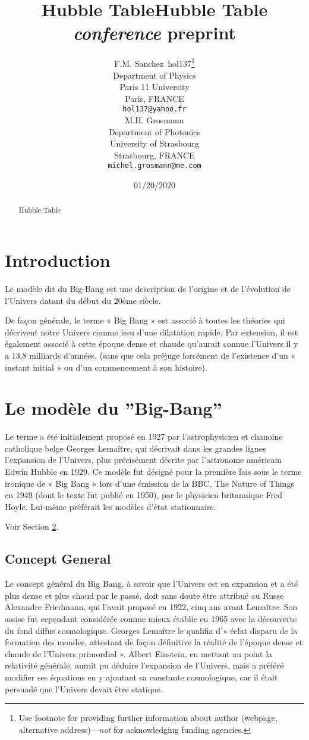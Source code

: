 \documentclass[a4paper,9pt]{article}
\title{Hubble Table}
\date{01/20/2020}
\title{Hubble Table \emph{conference} preprint}
\author{
  F.M. Sanchez~hol137\thanks{Use footnote for providing further
    information about author (webpage, alternative
    address)---\emph{not} for acknowledging funding agencies.} \\
  Department of Physics\\
  Paris 11 University\\
  Paris, FRANCE \\
  \texttt{hol137@yahoo.fr} \\
   \And
 M.H. Grosmann \\
  Department of Photonics\\
  University of Strasbourg\\
  Strasbourg, FRANCE \\
  \texttt{michel.grosmann@me.com} \\
}
\begin{document}
\maketitle

\begin{abstract}
Hubble Table
\end{abstract}




\section{Introduction}

Le modèle dit du Big-Bang est une description de l'origine et de l'évolution de l’Univers datant du début du 20éme siècle.

De façon générale, le terme « Big Bang » est associé à toutes les théories qui décrivent notre Univers comme issu d'une dilatation rapide. Par extension, il est également associé à cette époque dense et chaude qu’aurait connue l’Univers il y a 13,8 milliards d’années, (sans que cela préjuge forcément de l’existence d’un « instant initial » ou d’un commencement à son histoire).

\section{Le modèle du ”Big-Bang”}
\label{sec:headings}

Le terme a été initialement proposé en 1927 par l'astrophysicien  et chanoine catholique belge Georges Lemaître, qui décrivait dans les grandes lignes l’expansion de l'Univers, plus précisément décrite par l'astronome américain Edwin Hubble en 1929. Ce modèle fut désigné pour la première fois sous le terme ironique de « Big Bang » lors d’une émission de la BBC, The Nature of Things en 1949 (dont le texte fut publié en 1950), par le physicien britannique Fred Hoyle. Lui-même préférait les modèles d'état stationnaire.

Voir Section \ref{sec:headings}.

\subsection{Concept General}
Le concept général du Big Bang, à savoir que l’Univers est en expansion et a été plus dense et plus chaud par le passé, doit sans doute être attribué au Russe Alexandre Friedmann, qui l'avait proposé en 1922, cinq ans avant Lemaître. Son assise fut cependant considérée comme mieux établie en 1965 avec la découverte du fond diffus cosmologique. Georges Lemaître le qualifia d’« éclat disparu de la formation des mondes, attestant de façon définitive la réalité de l’époque dense et chaude de l’Univers primordial ». Albert Einstein, en mettant au point la relativité générale, aurait pu déduire l'expansion de l'Univers, mais a préféré modifier ses équations en y ajoutant sa constante cosmologique, car il était persuadé que l'Univers devait être statique.
\end{document}
